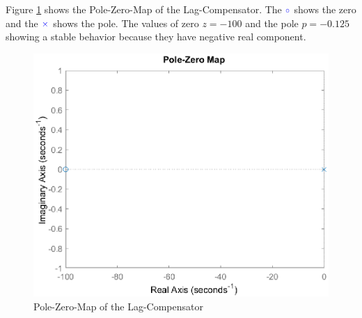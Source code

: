 Figure \ref{fig:ZeroPoleLag} shows the Pole-Zero-Map of the Lag-Compensator. The $\color{blue} \circ$ shows the zero and the $\color{blue} \times$ shows the pole. The values of zero $z = -100$ and the pole $p = -0.125$ showing a stable behavior because they have negative real component.

\begin{figure}[h]
	\centering	
	\includegraphics[width=12cm]{Figures/PoleZeroMapLagCompensator.eps}
	\caption{Pole-Zero-Map of the Lag-Compensator}
	\label{fig:ZeroPoleLag}
\end{figure} 

